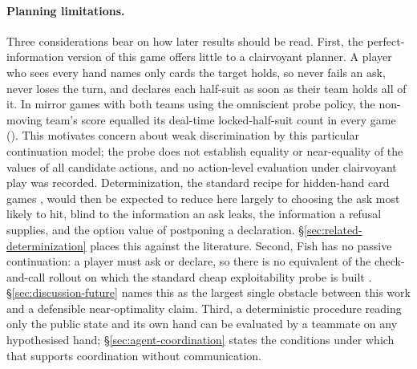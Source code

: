 \paragraph{Planning limitations.}
Three considerations bear on how later results should be read. First, the perfect-information version of
this game offers little to a clairvoyant planner. A player who sees every hand names only cards the
target holds, so never fails an ask, never loses the turn, and declares each half-suit as soon as
their team holds all of it. In \vsevenOmniProbeGames{} mirror games with both teams using the
omniscient probe policy, the non-moving team's score equalled its deal-time locked-half-suit count
in every game (). This motivates concern about
weak discrimination by this particular continuation model; the probe does not establish equality or
near-equality of the values of all candidate actions, and no action-level evaluation under
clairvoyant play was recorded. Determinization, the standard recipe for hidden-hand card games
\cite{levy,ginsberg-gib}, would then be expected to reduce here largely to choosing the
ask most likely to hit, blind to the information an ask leaks, the information a refusal supplies,
and the option value of postponing a declaration. \S\ref{sec:related-determinization}
places this against the literature. Second, Fish has no passive continuation: a player must ask or
declare, so there is no equivalent of the check-and-call rollout on which the standard cheap
exploitability probe is built \cite{lisy2017lbr}. \S\ref{sec:discussion-future} names this as the
largest single obstacle between this work and a defensible near-optimality claim. Third, a
deterministic procedure reading only the public state and its own hand can be evaluated by a
teammate on any hypothesised hand; \S\ref{sec:agent-coordination} states the conditions under which
that supports coordination without communication.
